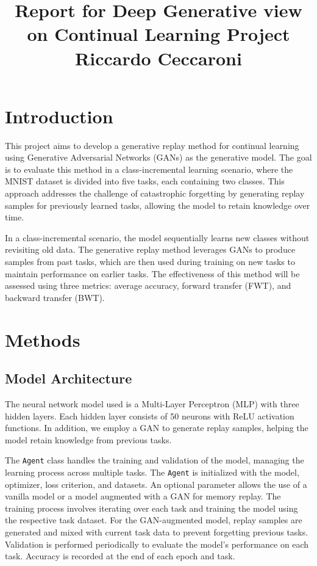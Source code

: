 \documentclass{article}
\title{Report for Deep Generative view on Continual Learning
Project\\[1cm]Riccardo Ceccaroni}
\begin{document}
\maketitle


\section{Introduction}
This project aims to develop a generative replay method for continual learning using Generative Adversarial Networks (GANs) as the generative model. The goal is to evaluate this method in a class-incremental learning scenario, where the MNIST dataset is divided into five tasks, each containing two classes. This approach addresses the challenge of catastrophic forgetting by generating replay samples for previously learned tasks, allowing the model to retain knowledge over time.

In a class-incremental scenario, the model sequentially learns new classes without revisiting old data. The generative replay method leverages GANs to produce samples from past tasks, which are then used during training on new tasks to maintain performance on earlier tasks. The effectiveness of this method will be assessed using three metrics: average accuracy, forward transfer (FWT), and backward transfer (BWT). 

\section{Methods}

\subsection{Model Architecture}
The neural network model used is a Multi-Layer Perceptron (MLP) with three hidden layers. Each hidden layer consists of 50 neurons with ReLU activation functions. In addition, we employ a GAN to generate replay samples, helping the model retain knowledge from previous tasks.

The \texttt{Agent} class handles the training and validation of the model, managing the learning process across multiple tasks.
The \texttt{Agent} is initialized with the model, optimizer, loss criterion, and datasets. An optional parameter allows the use of a vanilla model or a model augmented with a GAN for memory replay.
The training process involves iterating over each task and training the model using the respective task dataset. For the GAN-augmented model, replay samples are generated and mixed with current task data to prevent forgetting previous tasks.
Validation is performed periodically to evaluate the model's performance on each task. Accuracy is recorded at the end of each epoch and task.
\end{document}
